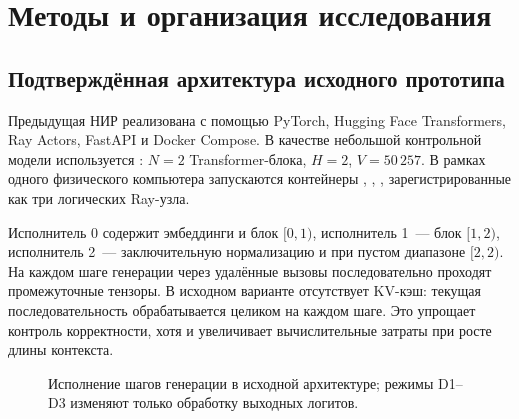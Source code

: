 \section{Методы и организация исследования}

\subsection{Подтверждённая архитектура исходного прототипа}

Предыдущая НИР реализована с помощью PyTorch, Hugging Face Transformers, Ray Actors, FastAPI и Docker Compose. В качестве небольшой контрольной модели используется : $N=2$ Transformer-блока, $H=2$, $V=50\,257$. В рамках одного физического компьютера запускаются контейнеры , , , зарегистрированные как три логических Ray-узла.

Исполнитель 0 содержит эмбеддинги и блок $[0,1)$, исполнитель 1~--- блок $[1,2)$, исполнитель 2~--- заключительную нормализацию и  при пустом диапазоне $[2,2)$. На каждом шаге генерации через удалённые вызовы последовательно проходят промежуточные тензоры. В исходном варианте отсутствует KV-кэш: текущая последовательность обрабатывается целиком на каждом шаге. Это упрощает контроль корректности, хотя и увеличивает вычислительные затраты при росте длины контекста.

\begin{figure}[t]
\centering
{}
\caption{Исполнение шагов генерации в исходной архитектуре; режимы D1--D3 изменяют только обработку выходных логитов.}
\label{fig:pipeline}
\end{figure}

